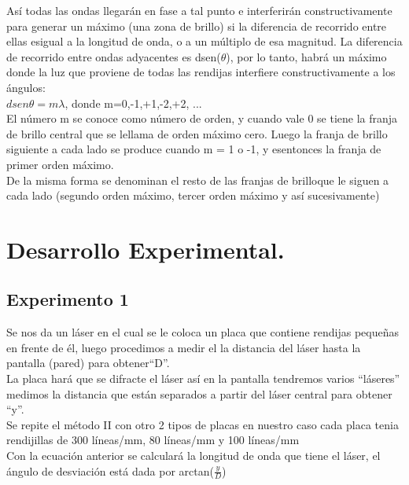 \documentclass[13,twocolumn,letterpaper]{article}
\begin{document}
Así  todas   las   ondas   llegarán   en   fase   a   tal   punto   e   interferirán constructivamente para generar un máximo (una zona de brillo) si la diferencia de recorrido entre ellas esigual a la longitud de onda, o a un múltiplo de esa magnitud. La diferencia de recorrido entre ondas adyacentes es dsen($\theta$), por lo tanto, habrá un máximo donde la luz que proviene de todas las rendijas interfiere constructivamente a los ángulos:\\

                  $dsenθ = m\lambda$, donde m=0,-1,+1,-2,+2, ...\\ 
                  
El número m se conoce como número de orden, y cuando vale 0 se tiene la franja de brillo central que se lellama de orden máximo cero. Luego la franja de brillo siguiente a cada lado se produce cuando m = 1 o -1, y esentonces la franja de primer orden máximo.\\

De la misma forma se denominan el resto de las franjas de brilloque le siguen a cada lado (segundo orden máximo, tercer orden máximo y así sucesivamente)

\section*{Desarrollo Experimental.}

\subsection*{Experimento 1}
Se nos da un láser en el cual se le coloca un placa que contiene rendijas pequeñas en frente de él, luego procedimos a medir el la distancia del láser hasta la pantalla (pared) para obtener“D”.\\

La placa hará que se difracte el láser así en la pantalla tendremos varios “láseres” medimos la distancia que están separados a partir del láser central para obtener “y”.\\

Se repite el método II con otro 2 tipos de placas en nuestro caso cada placa tenia rendijillas de 300 líneas/mm, 80 líneas/mm y 100 líneas/mm \\

Con la ecuación anterior se calculará la longitud de onda que tiene el láser, el ángulo de desviación está dada por arctan($\frac{y}{D}$) \\
\end{document}
